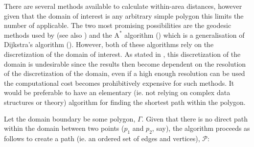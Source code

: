 There are several methods available to calculate within-area distances, however given that the domain of interest is any arbitrary simple polygon this limits the number of applicable. The two most promising possibilities are the geodesic methods used by \cite{wangranalli} (see also ) and the $\text{A}^*$ algorithm (\cite{astarpaper}) which is a generalisation of Dijkstra's algorithm (\cite{dijkstra}). However, both of these algorithms rely on the discretization of the domain of interest. As stated in , this discretization of the domain is undesirable since the results then become dependent on the resolution of the discretization of the domain, even if a high enough resolution can be used the computational cost becomes prohibitively expensive for such methods. It would be preferable to have an elementary (ie. not relying on complex data structures or theory) algorithm for finding the shortest path within the polygon.

Let the domain boundary be some polygon, $\Gamma$. Given that there is no direct path within the domain between two points ($p_1$ and $p_2$, say), the algorithm proceeds as follows to create a path (ie. an ordered set of edges and vertices), $\mathcal{P}$:

